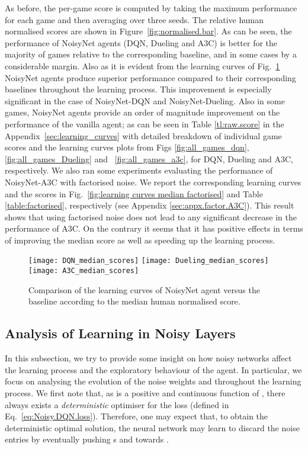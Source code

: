 \documentclass{article}
\newcommand{\algoinit}{NoisyNet}
\begin{document}
As before, the per-game score is computed by taking the maximum performance for each game and then averaging over three seeds. 
The relative human normalised scores are shown in Figure~\ref{fig:normalised.bar}.
As can be seen, the performance of \algoinit{} agents (DQN, Dueling and A3C) is better for the majority of games relative to the corresponding baseline, and in some cases by a considerable margin. Also as it is evident from the learning curves of Fig.~\ref{fig:learning curves median}  NoisyNet agents produce superior performance compared to their corresponding baselines throughout the learning process. This improvement is especially significant in the case of NoisyNet-DQN and NoisyNet-Dueling. Also in some games, \algoinit{} agents provide an order of magnitude improvement on the performance of the vanilla agent; as can be seen in Table \ref{tl:raw.score} in the Appendix~\ref{sec:learning_curves} with detailed breakdown of individual game scores and the learning curves plots from Figs \ref{fig:all_games_dqn}, \ref{fig:all_games_Dueling} and ~\ref{fig:all_games_a3c}, for DQN, Dueling and A3C,  respectively.
We also ran some experiments evaluating the performance of NoisyNet-A3C with factorised noise. We report the corresponding learning curves and the scores in Fig.~\ref{fig:learning curves median factorised} and Table \ref{table:factorised}, respectively (see Appendix \ref{sec:appx.factor.A3C}). This result shows that using factorised noise does not lead to any significant decrease in the performance of A3C. On the contrary it seems that it has positive effects in terms of improving the median score as well as speeding up the learning process. 
\begin{centering}
\begin{figure}[htp!]
    \texttt{[image: DQN\_median\_scores]}
    \texttt{[image: Dueling\_median\_scores]}
    \texttt{[image: A3C\_median\_scores]}
    \caption{Comparison of the learning curves of \algoinit{} agent versus the baseline according to the median human normalised score.}
    \label{fig:learning curves median} 
\end{figure}
\end{centering} 
\subsection{Analysis of Learning in Noisy Layers}
In this subsection, we try to provide some insight on how noisy networks affect the learning process and the exploratory behaviour of the agent. In particular, we  focus on analysing the evolution of the noise weights   and  throughout the learning process. We first note that, as  is a positive and continuous function of , there always exists a \emph{deterministic} optimiser for the loss  (defined in Eq.~\eqref{eq:Noisy.DQN.loss}). Therefore, one may expect that, to obtain the deterministic optimal solution, the neural network may learn to discard the noise entries by eventually pushing s and  towards . 
\end{document}
